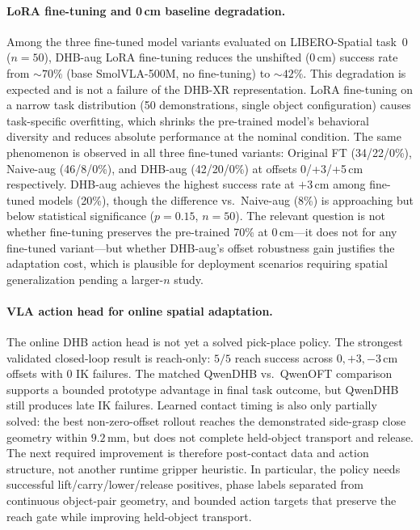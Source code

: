 \documentclass[11pt]{article}
\begin{document}
\paragraph{LoRA fine-tuning and 0\,cm baseline degradation.}
Among the three fine-tuned model variants evaluated on LIBERO-Spatial task~0 ($n=50$), DHB-aug LoRA fine-tuning reduces the unshifted (0\,cm) success rate from $\sim\!70\%$ (base SmolVLA-500M, no fine-tuning) to $\sim\!42\%$.
This degradation is expected and is not a failure of the DHB-XR representation.
LoRA fine-tuning on a narrow task distribution (50 demonstrations, single object configuration) causes task-specific overfitting, which shrinks the pre-trained model's behavioral diversity and reduces absolute performance at the nominal condition.
The same phenomenon is observed in all three fine-tuned variants: Original FT (34/22/0\%), Naive-aug (46/8/0\%), and DHB-aug (42/20/0\%) at offsets 0/+3/+5\,cm respectively.
DHB-aug achieves the highest success rate at $+3$\,cm among fine-tuned models (20\%), though the difference vs.\ Naive-aug (8\%) is approaching but below statistical significance ($p=0.15$, $n=50$).
The relevant question is not whether fine-tuning preserves the pre-trained 70\% at 0\,cm---it does not for any fine-tuned variant---but whether DHB-aug's offset robustness gain justifies the adaptation cost, which is plausible for deployment scenarios requiring spatial generalization pending a larger-$n$ study.

\paragraph{VLA action head for online spatial adaptation.}
The online DHB action head is not yet a solved pick-place policy. The strongest validated closed-loop result is reach-only: $5/5$ reach success across $0,+3,-3$\,cm offsets with $0$ IK failures. The matched QwenDHB vs.\ QwenOFT comparison supports a bounded prototype advantage in final task outcome, but QwenDHB still produces late IK failures. Learned contact timing is also only partially solved: the best non-zero-offset rollout reaches the demonstrated side-grasp close geometry within $9.2$\,mm, but does not complete held-object transport and release.
The next required improvement is therefore post-contact data and action structure, not another runtime gripper heuristic. In particular, the policy needs successful lift/carry/lower/release positives, phase labels separated from continuous object-pair geometry, and bounded action targets that preserve the reach gate while improving held-object transport.
\end{document}
